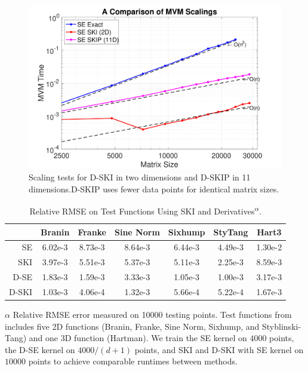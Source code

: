 \begin{figure}[ht]
  \begin{center}
    \includegraphics[width=\textwidth]{./sgpd/pics/mvmScaling}
    \caption{Scaling tests for D-SKI in two dimensions and D-SKIP in 11
    dimensions.D-SKIP uses fewer data points for identical matrix sizes.}
    \label{fig:scalingmvm}
  \end{center}
\end{figure}

\begin{table}[ht]
  \centering
  \caption{Relative RMSE on Test Functions Using SKI and
  Derivatives\textsuperscript{$\alpha$}.}\label{fig:testfncSKI}
  \begin{threeparttable}
    \begin{tabular}{r c c c c c c}
      \toprule 
      & Branin & Franke & Sine Norm & Sixhump & StyTang & Hart3 \\ \midrule
      SE & 6.02e-3 & 8.73e-3 & 8.64e-3 & 6.44e-3 & 4.49e-3 & 1.30e-2 \\
      SKI & 3.97e-3 & 5.51e-3 & 5.37e-3 & 5.11e-3 & 2.25e-3 & 8.59e-3 \\
      D-SE & 1.83e-3 & 1.59e-3 & 3.33e-3 & 1.05e-3 & 1.00e-3 & 3.17e-3 \\
      D-SKI & 1.03e-3 & 4.06e-4 & 1.32e-3 & 5.66e-4 & 5.22e-4 & 1.67e-3 \\ 
      \bottomrule
    \end{tabular}
    \begin{tablenotes}
      \item[$\alpha$]Relative RMSE error measured on 10000 testing points. Test
      functions from~\cite{sfutest2013} includes five 2D functions (Branin,
      Franke, Sine Norm, Sixhump, and Styblinski-Tang) and one 3D function 
      (Hartman). We train the SE kernel on $4000$ points, the D-SE kernel on
      $4000/(d+1)$ points, and SKI and D-SKI with SE kernel on $10000$ points to
      achieve comparable runtimes between methods.
    \end{tablenotes}
  \end{threeparttable}
\end{table}

